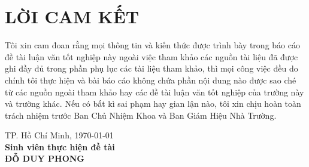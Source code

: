 
\newpage
\chapter{LỜI CAM KẾT}

\setlength\parindent{0pt}
\hspace{0.5cm}Tôi xin cam đoan rằng mọi thông tin và kiến thức được trình bày trong báo cáo đề tài luận văn tốt nghiệp này ngoài việc tham khảo các nguồn tài liệu đã được ghi đầy đủ trong phần phụ lục các tài liệu tham khảo, thì mọi công việc đều do chính tôi thực hiện và bài báo cáo không chứa phần nội dung nào được sao ché từ các nguồn ngoài tham khảo hay các đề tài luận văn tốt nghiệp của trường này và trường khác. Nếu có bất kì sai phạm hay gian lận nào, tôi xin chịu hoàn toàn trách nhiệm trước Ban Chủ Nhiệm Khoa và Ban Giám Hiệu Nhà Trường.\\

\hspace{5cm}
\begin{minipage}[t]{0.60\linewidth}
	\begin{center}
		TP. Hồ Chí Minh, \today\\
		\textbf{Sinh viên thực hiện đề tài}\\[3cm]
		\textbf{ĐỖ DUY PHONG}
	\end{center}
\end{minipage}

